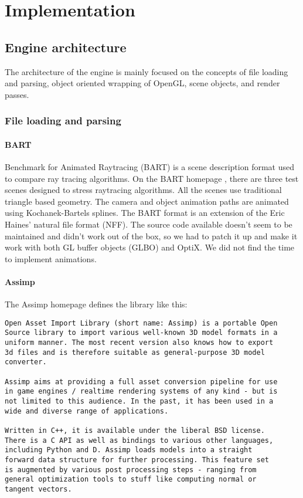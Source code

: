 \section{Implementation}

\subsection{Engine architecture}
The architecture of the engine is mainly focused on the concepts of file loading and parsing, object oriented wrapping of OpenGL, scene objects, and render passes.

\subsubsection{File loading and parsing}
\paragraph{BART}
Benchmark for Animated Raytracing (BART) is a scene description format used to compare ray tracing algorithms. On the BART homepage \cite{bart_homepage}, there are three test scenes designed to stress raytracing algorithms. All the scenes use traditional triangle based geometry. The camera and object animation paths are animated using  Kochanek-Bartels splines. The BART format is an extension of the Eric Haines' natural file format (NFF). The source code available doesn't seem to be maintained and didn't work out of the box, so we had to patch it up and make it work with both GL buffer objects (GLBO) and OptiX. We did not find the time to implement animations.

\paragraph{Assimp}
The Assimp homepage \cite{assimp_homepage} defines the library like this:
\begin{Verbatim}[frame=single,fontshape=it,framesep=1mm]
Open Asset Import Library (short name: Assimp) is a portable Open
Source library to import various well-known 3D model formats in a 
uniform manner. The most recent version also knows how to export 
3d files and is therefore suitable as general-purpose 3D model 
converter.

Assimp aims at providing a full asset conversion pipeline for use 
in game engines / realtime rendering systems of any kind - but is 
not limited to this audience. In the past, it has been used in a 
wide and diverse range of applications.

Written in C++, it is available under the liberal BSD license. 
There is a C API as well as bindings to various other languages, 
including Python and D. Assimp loads models into a straight
forward data structure for further processing. This feature set 
is augmented by various post processing steps - ranging from 
general optimization tools to stuff like computing normal or 
tangent vectors.
\end{Verbatim}

